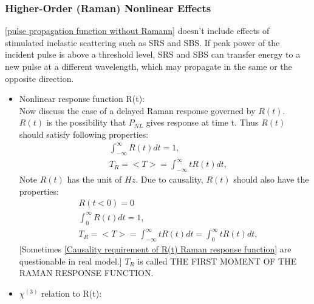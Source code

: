 \documentclass[12pt]{extarticle}
\numberwithin{equation}{section}
\numberwithin{figure}{section}
\numberwithin{table}{section}
\newcommand{\<}{\langle}
\renewcommand{\>}{\rangle}
\theoremstyle{definition}
\begin{document}
    \subsubsection{Higher-Order (Raman) Nonlinear Effects}\label{section: Higher-Order Nonlinear Effects}
        \autoref{pulse propagation function without Ramann} doesn't include effects of stimulated inelastic scattering such as SRS and SBS. If peak power of the incident pulse is above a threshold level, SRS and SBS can transfer energy to a new pulse at a different wavelength, which may propagate in the same or the opposite direction.
        \begin{itemize}
            \item Nonlinear response function R(t):\\
                Now discuss the case of a delayed Raman response governed by $R(t)$. $R(t)$ is the possibility that $P_{NL}$ gives response at time t. Thus $R(t)$ should satisfy following properties:
                \begin{subequations}
                \begin{align}
                    &\int_{-\infty}^\infty R(t)dt=1,\\
                    &T_R = <T> = \int_{-\infty}^\infty tR(t)dt,
                \end{align}
                \end{subequations}
                Note $R(t)$ has the unit of $Hz$. Due to causality, $R(t)$ should also have the properties:
                \begin{subequations}
                \begin{align}
                    &R(t<0)=0\label{Causality requirement of R(t) Raman response function}\\
                    &\int_{0}^\infty R(t)dt=1,\\
                    &T_R = <T> = \int_{-\infty}^\infty tR(t)dt = \int_{0}^\infty tR(t)dt\label{expectation value expression by R(t)},
                \end{align}
                \label{properties of R(t): normalization, causality and expectation}
                \end{subequations}
                [Sometimes \autoref{Causality requirement of R(t) Raman response function} are questionable in real model.] $T_R$ is called \MakeUppercase{the first moment of the Raman response function}.
            \item $\chi^{(3)}$ relation to R(t):\\

\end{itemize}
\end{document}
